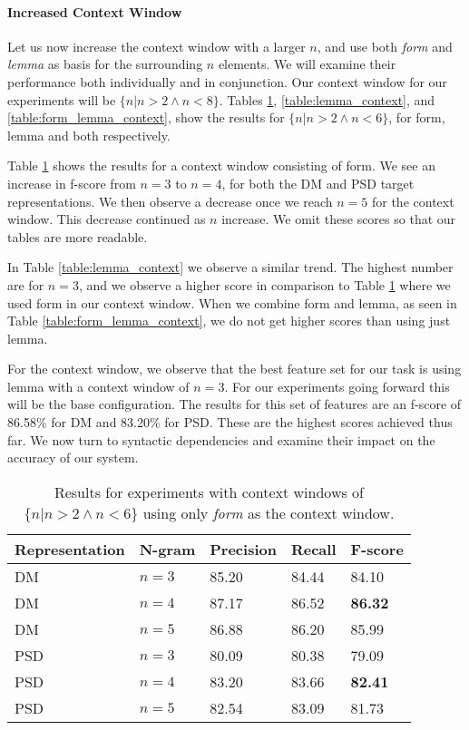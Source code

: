 \paragraph{Increased Context Window} Let us now increase the context window with a larger $n$, and use both \textit{form} and \textit{lemma} as basis for the surrounding $n$ elements. We will examine their performance both individually and in conjunction. Our context window for our experiments will be ${\{n|n>2 \wedge n<8\}}$. Tables \ref{table:form_context}, \ref{table:lemma_context}, and \ref{table:form_lemma_context}, show the results for ${\{n|n>2 \wedge n<6\}}$, for form, lemma and both respectively. 

Table \ref{table:form_context} shows the results for a context window consisting of form. We see an increase in f-score from $n=3$ to $n=4$, for both the DM and PSD target representations. We then observe a decrease once we reach $n=5$ for the context window. This decrease continued as $n$ increase. We omit these scores so that our tables are more readable.

In Table \ref{table:lemma_context} we observe a similar trend. The highest number are for $n=3$, and we observe a higher score in comparison to Table \ref{table:form_context} where we used form in our context window. When we combine form and lemma, as seen in Table \ref{table:form_lemma_context}, we do not get higher scores than using just lemma.

For the context window, we observe that the best feature set for our task is using lemma with a context window of $n=3$. For our experiments going forward this will be the base configuration. The results for this set of features are an f-score of 86.58\% for DM and 83.20\% for PSD. These are the highest scores achieved thus far. We now turn to syntactic dependencies and examine their impact on the accuracy of our system.

\begin{table}
    \centering
    \smaller[0.2]
    \begin{tabular}{@{}lllll@{}}
        \toprule
        \textbf{Representation} & \textbf{N-gram} & \textbf{Precision} & \textbf{Recall} & \textbf{F-score} \\
        \midrule
        DM & $n=3$ & 85.20 & 84.44 & 84.10 \\
        DM & $n=4$  & 87.17 & 86.52 & \textbf{86.32} \\
        DM & $n=5$  & 86.88 & 86.20 & 85.99 \\
        \midrule
        PSD & $n=3$ & 80.09 & 80.38 & 79.09 \\
        PSD & $n=4$ & 83.20 & 83.66 & \textbf{82.41} \\
        PSD & $n=5$ & 82.54 & 83.09 & 81.73 \\
        \bottomrule
    \end{tabular}
    \caption{Results for experiments with context windows of ${\{n|n>2 \wedge n<6\}}$ using only \textit{form} as the context window.}
    \label{table:form_context}
\end{table}

